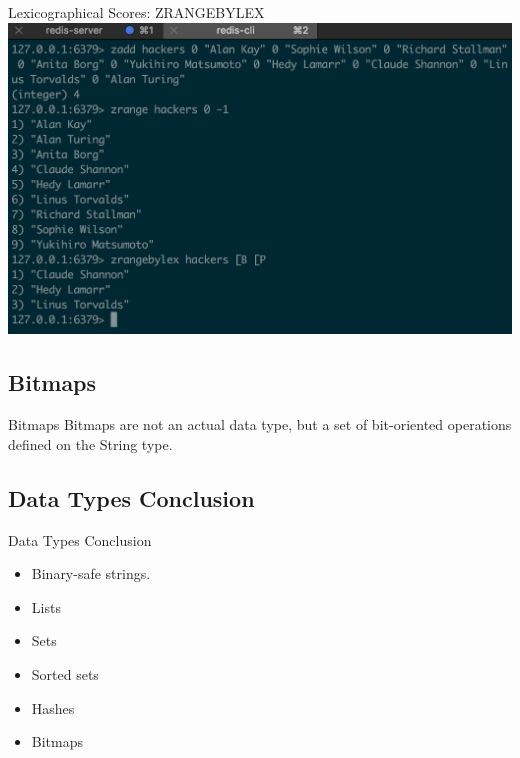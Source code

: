 \documentclass[10pt]{beamer}
\begin{document}
\begin{frame}[fragile]{Lexicographical Scores: ZRANGEBYLEX}
  \includegraphics[scale=0.5]{img/zrangebylex}
\end{frame}

\subsection{Bitmaps}

\begin{frame}[fragile]{Bitmaps}
  Bitmaps are not an actual data type, but a set of bit-oriented operations
  defined on the String type.
\end{frame}

\subsection{Data Types Conclusion}

\begin{frame}{Data Types Conclusion}
  \begin{itemize}
		\item Binary-safe strings.
		\item Lists
		\item Sets
    \item Sorted sets
    \item Hashes
    \item Bitmaps
	\end{itemize}
\end{frame}
\end{document}
